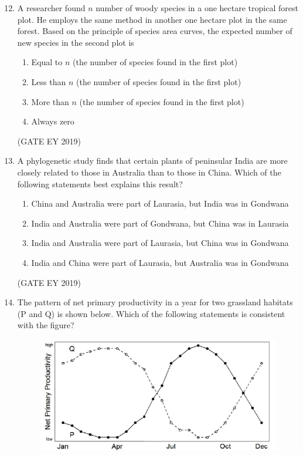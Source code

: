 \documentclass[journal,12pt,onecolumn]{IEEEtran}
\theoremstyle{remark}
\begin{document}
\begin{enumerate}[leftmargin=*]
\setcounter{enumi}{11}
\item A researcher found $n$ number of woody species in a one hectare tropical forest plot. He employs the same method in another one hectare plot in the same forest. Based on the principle of species area curves, the expected number of new species in the second plot is

\begin{multicols}{2}
\begin{enumerate}[nosep]
\item Equal to $n$ (the number of species found in the first plot)
\item Less than $n$ (the number of species found in the first plot)
\item More than $n$ (the number of species found in the first plot)
\item Always zero
\end{enumerate}
\end{multicols}
\hfill{(GATE EY 2019)}
\item A phylogenetic study finds that certain plants of peninsular India are more closely related to those in Australia than to those in China. Which of the following statements best explains this result?

\begin{enumerate}[nosep]
\item China and Australia were part of Laurasia, but India was in Gondwana
\item India and Australia were part of Gondwana, but China was in Laurasia
\item India and Australia were part of Laurasia, but China was in Gondwana
\item India and China were part of Laurasia, but Australia was in Gondwana
\end{enumerate}
\hfill{(GATE EY 2019)}
\item The pattern of net primary productivity in a year for two grassland habitats (P and Q) is shown below. Which of the following statements is consistent with the figure?
\begin{figure}[h]
    \centering
    \includegraphics[]{figs/14.png}
    \caption{}
    \label{fig;1}
\end{figure}



\end{enumerate}
\end{document}

